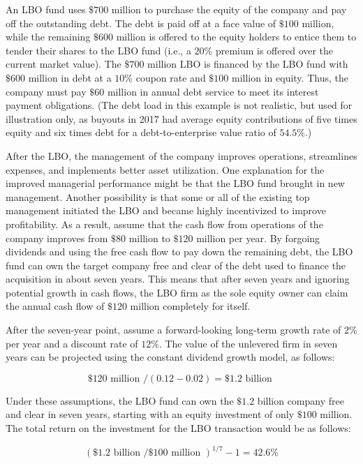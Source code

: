 \documentclass[11pt]{article}
\begin{document}
An LBO fund uses $\$ 700$ million to purchase the equity of the company and pay off the outstanding debt. The debt is paid off at a face value of $\$ 100$ million, while the remaining $\$ 600$ million is offered to the equity holders to entice them to tender their shares to the LBO fund (i.e., a $20 \%$ premium is offered over the current market value). The $\$ 700$ million LBO is financed by the LBO fund with $\$ 600$ million in debt at a $10 \%$ coupon rate and $\$ 100$ million in equity. Thus, the company must pay $\$ 60$ million in annual debt service to meet its interest payment obligations. (The debt load in this example is not realistic, but used for illustration only, as buyouts in 2017 had average equity contributions of five times equity and six times debt for a debt-to-enterprise value ratio of $54.5 \%$.)

After the LBO, the management of the company improves operations, streamlines expenses, and implements better asset utilization. One explanation for the improved managerial performance might be that the LBO fund brought in new management. Another possibility is that some or all of the existing top management initiated the LBO and became highly incentivized to improve profitability. As a result, assume that the cash flow from operations of the company improves from $\$ 80$ million to $\$ 120$ million per year. By forgoing dividends and using the free cash flow to pay down the remaining debt, the LBO fund can own the target company free and clear of the debt used to finance the acquisition in about seven years. This means that after seven years and ignoring potential growth in cash flows, the LBO firm as the sole equity owner can claim the annual cash flow of $\$ 120$ million completely for itself.

After the seven-year point, assume a forward-looking long-term growth rate of $2 \%$ per year and a discount rate of $12 \%$. The value of the unlevered firm in seven years can be projected using the constant dividend growth model, as follows:

$$
\$ 120 \text { million } /(0.12-0.02)=\$ 1.2 \text { billion }
$$

Under these assumptions, the LBO fund can own the $\$ 1.2$ billion company free and clear in seven years, starting with an equity investment of only $\$ 100$ million. The total return on the investment for the LBO transaction would be as follows:

$$
(\$ 1.2 \text { billion } / \$ 100 \text { million })^{1 / 7}-1=42.6 \%
$$
\end{document}
